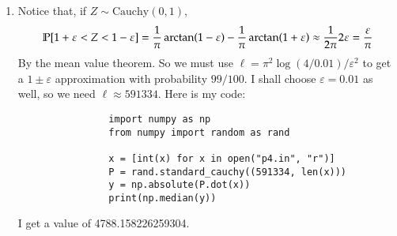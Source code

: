 \documentclass[12pt]{article}
\theoremstyle{definitionstyle}
\def \ve{\varepsilon}
\renewcommand{\P}{\mathbb{P}\qty}
\begin{document}
\begin{enumerate}[leftmargin=\labelsep]
\begin{enumerate}
			\item Notice that, if $Z \sim \mathrm{Cauchy}(0, 1)$,
			\begin{align*}
				\P[1+\ve < Z < 1-\ve] = \frac1\pi \arctan(1-\ve) - \frac1\pi \arctan(1+\ve) \approx \frac{1}{2\pi} 2\ve = \frac{\ve}{\pi}
			\end{align*}
			By the mean value theorem. So we must use $\ell = \pi^2\log(4/0.01)/\ve^2$ to get a $1\pm \ve$ approximation with probability $99/100$. I shall choose $\ve = 0.01$ as well, so we need $\ell \approx 591334$. Here is my code:
			\begin{lstlisting}
				import numpy as np
				from numpy import random as rand
				
				x = [int(x) for x in open("p4.in", "r")]
				P = rand.standard_cauchy((591334, len(x)))
				y = np.absolute(P.dot(x))
				print(np.median(y))
			\end{lstlisting}
			I get a value of 4788.158226259304.
		\end{enumerate}
	

\end{enumerate}
\end{document}
